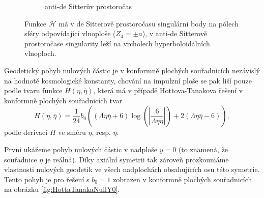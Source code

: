 \begin{figure}[ht]
\begin{subfigure}[b]{0.45\textwidth}
\begin{tikzpicture}
        \end{tikzpicture}
        \caption{anti-de Sitterův prostoročas}
    \end{subfigure}
    \caption{Funkce $\mathcal{H}$ má v de Sitterově prostoročasu singulární body na pólech sféry odpovídající vlnoploše ($Z_4 = \pm a$), v anti-de Sitterově
    prostoročase singularity leží na vrcholech hyperboloidálních vlnoploch.}
    \label{fig:funkceHhodnotyvADS}
\end{figure}

Geodetický pohyb nulových částic je v konformně plochých souřadnicích
nezávislý na hodnotě kosmologické konstanty, chování na impulzní ploše se pak liší pouze podle tvaru funkce $H(\eta, \bar{\eta})$, která má v případě Hottova-Tanakova řešení
v konformně plochých souřadnicích tvar
\begin{equation}
    \label{eq:Hotta_Tanaka_H_conf_flat_coords}
    H(\eta, \bar{\eta}) = \frac{1}{24} b_0 \left((\Lambda \eta \bar{\eta} + 6) \log \left(\left| \frac{6}{\Lambda \eta \bar{\eta} }\right| \right)+2 (\Lambda \eta \bar{\eta} - 6)\right),
\end{equation}
 podle derivací $H$ ve směru $\eta$, resp. $\bar{\eta}$.

První ukážeme pohyb nulových částic v nadploše $y=0$ (to znamená, že souřadnice $\eta$ je reálná). Díky axiální symetrii tak zároveň prozkoumáme
vlastnosti nulových geodetik ve všech nadplochách obsahujících osu této symetrie.
Tento pohyb je pro řešení s $b_0 = 1$ zobrazen v konformně plochých souřadnicích  na obrázku \ref{fig:HottaTanakaNullY0}.

